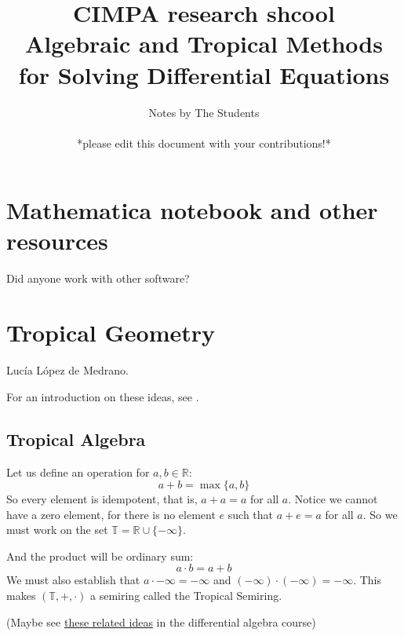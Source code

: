 \documentclass{article}
\title{CIMPA research shcool \\Algebraic and Tropical Methods for Solving Differential Equations}
\author{Notes by The Students\\\leavevmode\\
*please edit this document with your contributions!*}
\theoremstyle{definition}
\newcommand{\R}{\mathbb{R}}
\newcommand{\T}{\mathbb{T}}
\begin{document}
\maketitle
\tableofcontents\newpage
\section*{Mathematica notebook and other resources}
Did anyone work with other software?\par
\newpage
\section{Tropical Geometry}
\label{tropgeom}

Lucía López de Medrano.\par 
For an introduction on these ideas, see \cite{brugallé2014bit}.
\subsection{Tropical Algebra}
Let us define an operation for $a,b\in\R$:
\begin{equation*}
	a+b=\max\{a,b\}
\end{equation*}
So every element is idempotent, that is, $a+a=a$ for all $a$. Notice we cannot have a zero element, for there is no element $e$ such that $a+e=a$ for all $a$. So we must work on the set $\T=\R\cup\{-\infty\}$.\par
And the product will be ordinary sum:
\begin{equation*}
	a\cdot b=a+b
\end{equation*}
We must also establish that $a\cdot -\infty=-\infty$ and $(-\infty)\cdot(-\infty)=-\infty$. This makes $(\T,+,\cdot)$ a semiring called the Tropical Semiring.\par
(Maybe see \hyperref[difalgtrop]{these related ideas} in the differential algebra course)
\end{document}
